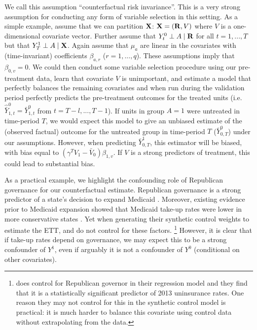 We call this assumption ``counterfactual risk invariance''. This is a very strong assumption for conducting any form of variable selection in this setting. As a simple example, assume that we can partition $\mathbf{X}$: $\mathbf{X} = (\mathbf{R},V)$ where $V$ is a one-dimensional covariate vector. Further assume that $Y^0_t \perp A \mid \mathbf{R}$ for all $t = 1, ..., T$ but that $Y^1_T \perp A \mid \mathbf{X}$. Again assume that $\mu_a$ are linear in the covariates with (time-invariant) coefficients $\beta_{a, r}$ ($r = 1, ..., q$). These assumptions imply that $\beta_{0, v} = 0$. We could then conduct some variable selection procedure using our pre-treatment data, learn that covariate $V$ is unimportant, and estimate a model that perfectly balances the remaining covariates and when run during the validation period perfectly predicts the pre-treatment outcomes for the treated units (i.e. $\hat{\bar{Y}}^0_{1, t} = \bar{Y}^0_{1, t}$ from $t = T - l, ..., T - 1$). If units in group $A = 1$ were untreated in time-period $T$, we would expect this model to give an unbiased estimate of the (observed factual) outcome for the untreated group in time-period $T$ ($\bar{Y}^0_{0, T}$) under our assumptions. However, when predicting $\bar{Y}^1_{0, T}$, this estimator will be biased, with bias equal to $(\gamma^TV_1 - \bar{V}_0) \beta_{1, v}$. If $V$ is a strong predictors of treatment, this could lead to substantial bias.

As a practical example, we highlight the confounding role of Republican governance for our counterfactual estimate. Republican governance is a strong predictor of a state's decision to expand Medicaid \cite{courtemanche2017early}. Moreover, existing evidence prior to Medicaid expansion showed that Medicaid take-up rates were lower in more conservative states \cite{sommers2012understanding}. Yet when generating their synthetic control weights to estimate the ETT, \cite{courtemanche2017early} and \cite{kaestner2017effects} do not control for these factors. \footnote{\cite{courtemanche2017early} does control for Republican governor in their regression model and they find that it is a statistically significant predictor of 2013 uninsurance rates. One reason they may not control for this in the synthetic control model is practical: it is much harder to balance this covariate using control data without extrapolating from the data.} However, it is clear that if take-up rates depend on governance, we may expect this to be a strong confounder of $Y^1$, even if arguably it is not a confounder of $Y^0$ (conditional on other covariates). 

